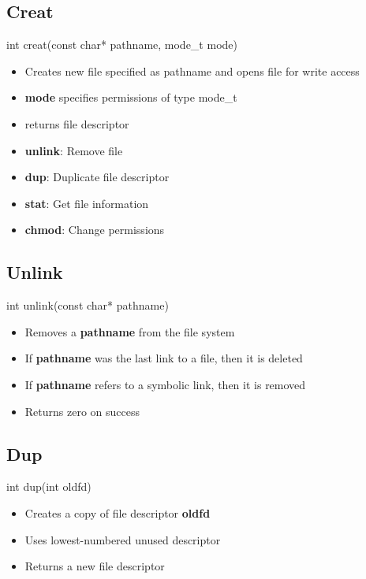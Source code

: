 \documentclass{report}
\begin{document}
    \bigbreak \noindent 
    \subsection{Creat}
    \bigbreak \noindent 
    \begin{cppcode}
    int creat(const char* pathname, mode_t mode)
    \end{cppcode}
    \begin{itemize}
        \item Creates new file specified as pathname and opens file for write access
        \item \textbf{mode} specifies permissions of type mode\_t
        \item returns file descriptor
    \end{itemize}
    \bigbreak \noindent 

    \pagebreak 
    \begin{itemize}
        \item \textbf{unlink}: Remove file
        \item \textbf{dup}: Duplicate file descriptor
        \item \textbf{stat}: Get file information
        \item \textbf{chmod}: Change permissions
    \end{itemize}

    \bigbreak \noindent 
    \subsection{Unlink}
    \bigbreak \noindent 
    \begin{cppcode}
    int unlink(const char* pathname)
    \end{cppcode}
    \begin{itemize}
        \item Removes a \textbf{pathname} from the file system
        \item If \textbf{pathname} was the last link to a file, then it is deleted
        \item If \textbf{pathname} refers to a symbolic link, then it is removed
        \item Returns zero on success
    \end{itemize}

    \bigbreak \noindent 
    \subsection{Dup}
    \bigbreak \noindent 
    \begin{cppcode}
    int dup(int oldfd)
    \end{cppcode}
    \begin{itemize}
        \item Creates a copy of file descriptor \textbf{oldfd}
        \item Uses lowest-numbered unused descriptor
        \item Returns a new file descriptor
    \end{itemize}
    \bigbreak \noindent 
\end{document}
